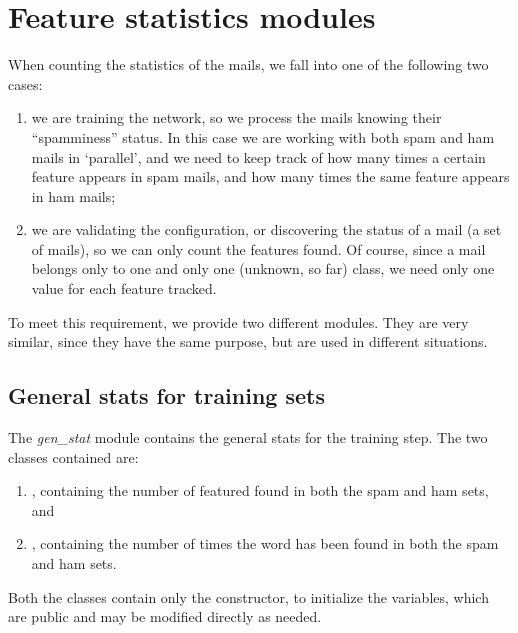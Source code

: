 \documentclass[letterpaper,10pt,english]{sphinxmanual}
\begin{document}
\chapter{Feature statistics modules}
\label{index:feature-statistics-modules}
When counting the statistics of the mails, we fall into one of the following two cases:
\begin{enumerate}
\item {} 
we are training the network, so we process the mails knowing their ``spamminess'' status. In this case we are working with both spam and ham mails in `parallel', and we need to keep track of how many times a certain feature appears in spam mails, and how many times the same feature appears in ham mails;

\item {} 
we are validating the configuration, or discovering the status of a mail (a set of mails), so we can only count the features found. Of course, since a mail belongs only to one and only one (unknown, so far) class, we need only one value for each feature tracked.

\end{enumerate}

To meet this requirement, we provide two different modules. They are very similar, since they have the same purpose, but are used in different situations.


\section{General stats for training sets}
\label{index:general-stats-for-training-sets}
The \emph{gen\_stat} module contains the general stats for the training step. The two classes contained are:
\begin{enumerate}
\item {} 
, containing the number of featured found in both the spam and ham sets, and

\item {} 
, containing the number of times the word has been found in both the spam and ham sets.

\end{enumerate}

Both the classes contain only the constructor, to initialize the variables, which are public and may be modified directly as needed.
\label{index:module-gen_stat}
\end{document}
